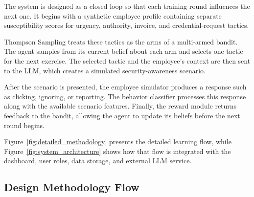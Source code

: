 \documentclass[12pt,a4paper]{article}
\begin{document}
The system is designed as a closed loop so that each training round
influences the next one. It begins with a synthetic employee profile
containing separate susceptibility scores for urgency, authority,
invoice, and credential-request tactics.

Thompson Sampling treats these tactics as the arms of a multi-armed
bandit. The agent samples from its current belief about each arm and
selects one tactic for the next exercise. The selected tactic and the
employee's context are then sent to the LLM, which creates a simulated
security-awareness scenario.

After the scenario is presented, the employee simulator produces a
response such as clicking, ignoring, or reporting. The behavior
classifier processes this response along with the available scenario
features. Finally, the reward module returns feedback to the bandit,
allowing the agent to update its beliefs before the next round begins.

Figure~\ref{fig:detailed_methodology} presents the detailed learning
flow, while Figure~\ref{fig:system_architecture} shows how that flow is
integrated with the dashboard, user roles, data storage, and external
LLM service.

\subsection{Design Methodology Flow}
\end{document}
